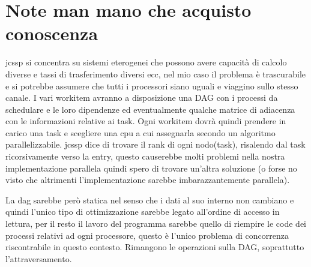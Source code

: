 \documentclass{article}
\begin{document}
    \section{Note man mano che acquisto conoscenza}
        jcssp si concentra su sistemi eterogenei che possono avere capacità di calcolo diverse e tassi di trasferimento diversi ecc, nel mio caso il problema è trascurabile e si potrebbe assumere che tutti i processori siano uguali e viaggino sullo stesso canale.
        I vari workitem avranno a disposizione una DAG con i processi da schedulare e le loro dipendenze ed eventualmente qualche matrice di adiacenza con le informazioni relative ai task. Ogni workitem dovrà quindi prendere in carico una task e scegliere una cpu a cui assegnarla secondo un algoritmo parallelizzabile. 
        jcssp dice di trovare il rank di ogni nodo(task), risalendo dal task ricorsivamente verso la entry, questo causerebbe molti problemi nella nostra implementazione parallela quindi spero di trovare un'altra soluzione (o forse no visto che altrimenti l'implementazione sarebbe imbarazzantemente parallela).


        La dag sarebbe però statica nel senso che i dati al suo interno non cambiano e quindi l'unico tipo di ottimizzazione sarebbe legato all'ordine di accesso in lettura, per il resto il lavoro del programma sarebbe quello di riempire le code dei processi relativi ad ogni processore, questo è l'unico problema di concorrenza riscontrabile in questo contesto.
        Rimangono le operazioni sulla DAG, soprattutto l'attraversamento.
\end{document}
